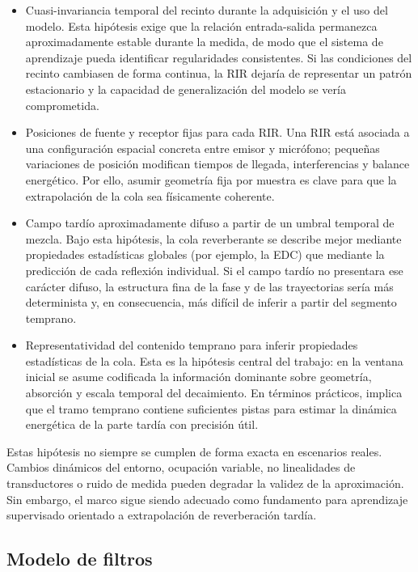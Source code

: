 \begin{itemize}
\item Cuasi-invariancia temporal del recinto durante la adquisición y el uso del modelo. Esta hipótesis exige que la relación entrada-salida permanezca aproximadamente estable durante la medida, de modo que el sistema de aprendizaje pueda identificar regularidades consistentes. Si las condiciones del recinto cambiasen de forma continua, la RIR dejaría de representar un patrón estacionario y la capacidad de generalización del modelo se vería comprometida.
\item Posiciones de fuente y receptor fijas para cada RIR. Una RIR está asociada a una configuración espacial concreta entre emisor y micrófono; pequeñas variaciones de posición modifican tiempos de llegada, interferencias y balance energético. Por ello, asumir geometría fija por muestra es clave para que la extrapolación de la cola sea físicamente coherente.
\item Campo tardío aproximadamente difuso a partir de un umbral temporal de mezcla. Bajo esta hipótesis, la cola reverberante se describe mejor mediante propiedades estadísticas globales (por ejemplo, la EDC) que mediante la predicción de cada reflexión individual. Si el campo tardío no presentara ese carácter difuso, la estructura fina de la fase y de las trayectorias sería más determinista y, en consecuencia, más difícil de inferir a partir del segmento temprano.
\item Representatividad del contenido temprano para inferir propiedades estadísticas de la cola. Esta es la hipótesis central del trabajo: en la ventana inicial se asume codificada la información dominante sobre geometría, absorción y escala temporal del decaimiento. En términos prácticos, implica que el tramo temprano contiene suficientes pistas para estimar la dinámica energética de la parte tardía con precisión útil.
\end{itemize}

Estas hipótesis no siempre se cumplen de forma exacta en escenarios reales. Cambios dinámicos del entorno, ocupación variable, no linealidades de transductores o ruido de medida pueden degradar la validez de la aproximación. Sin embargo, el marco sigue siendo adecuado como fundamento para aprendizaje supervisado orientado a extrapolación de reverberación tardía.

\subsection{Modelo de filtros}


